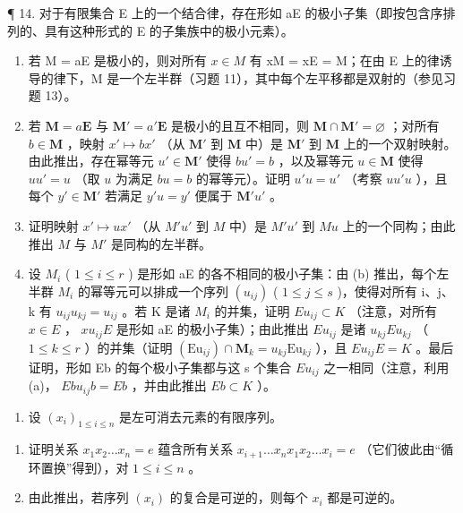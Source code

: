 ¶ 14. 对于有限集合 E 上的一个结合律，存在形如 aE 的极小子集（即按包含序排列的、具有这种形式的 E 的子集族中的极小元素）。

\begin{enumerate}
\def\labelenumi{(\alph{enumi})}
\item
  若 M = aE 是极小的，则对所有 \(x \in M\) 有 xM = xE = M；在由 E 上的律诱导的律下，M 是一个左半群（习题 11），其中每个左平移都是双射的（参见习题 13）。
\item
  若 \(\mathbf{M} = a\mathbf{E}\) 与 \(\mathbf{M}' = a'\mathbf{E}\) 是极小的且互不相同，则 \(\mathbf{M} \cap \mathbf{M}' = \varnothing\) ；对所有 \(b \in \mathbf{M}\) ，映射 \(x' \mapsto bx'\) （从 \(\mathbf{M}'\) 到 \(\mathbf{M}\) 中）是 \(\mathbf{M}'\) 到 \(\mathbf{M}\) 上的一个双射映射。由此推出，存在幂等元 \(u' \in \mathbf{M}'\) 使得 \(bu' = b\) ，以及幂等元 \(u \in \mathbf{M}\) 使得 \(uu' = u\) （取 \(u\) 为满足 \(bu = b\) 的幂等元）。证明 \(u'u = u'\) （考察 \(uu'u\) ），且每个 \(y' \in \mathbf{M}'\) 若满足 \(y'u = y'\) 便属于 \(\mathbf{M}'u'\) 。
\item
  证明映射 \(x' \mapsto ux'\) （从 \(M'u'\) 到 \(M\) 中）是 \(M'u'\) 到 \(Mu\) 上的一个同构；由此推出 \(M\) 与 \(M'\) 是同构的左半群。
\item
  设 \(M_{i}\) ( \(1 \leqslant i \leqslant r\) ) 是形如 aE 的各不相同的极小子集：由 (b) 推出，每个左半群 \(M_{i}\) 的幂等元可以排成一个序列 \((u_{ij})\) ( \(1 \leqslant j \leqslant s\) )，使得对所有 i、j、k 有 \(u_{ij}u_{kj} = u_{ij}\) 。若 K 是诸 \(M_{i}\) 的并集，证明 \(Eu_{ij} \subset K\) （注意，对所有 \(x \in E\) ， \(xu_{ij}E\) 是形如 aE 的极小子集）；由此推出 \(Eu_{ij}\) 是诸 \(u_{kj}Eu_{kj}\) （ \(1 \leqslant k \leqslant r\) ）的并集（证明 \((\mathrm{Eu}_{ij}) \cap \mathbf{M}_{k} = u_{kj}\mathrm{Eu}_{kj}\) ），且 \(Eu_{ij}E = K\) 。最后证明，形如 Eb 的每个极小子集都与这 s 个集合 \(Eu_{ij}\) 之一相同（注意，利用 (a)， \(Ebu_{ij}b = Eb\) ，并由此推出 \(Eb \subset K\) ）。
\end{enumerate}

\begin{enumerate}
\def\labelenumi{\arabic{enumi}.}
\setcounter{enumi}{14}
\tightlist
\item
  设 \((x_{i})_{1\leqslant i\leqslant n}\) 是左可消去元素的有限序列。
\end{enumerate}

\begin{enumerate}
\def\labelenumi{(\alph{enumi})}
\item
  证明关系 \(x_{1}x_{2}\ldots x_{n} = e\) 蕴含所有关系 \(x_{i + 1}\ldots x_nx_1x_2\ldots x_i = e\) （它们彼此由“循环置换”得到），对 \(1\leqslant i\leqslant n\) 。
\item
  由此推出，若序列 \((x_{i})\) 的复合是可逆的，则每个 \(x_{i}\) 都是可逆的。
\end{enumerate}

